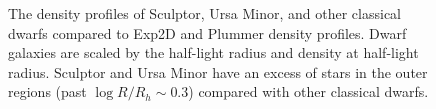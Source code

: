 \begin{figure}
\centering
{}
\caption[Classical dwarf density profiles]{The density profiles of
Sculptor, Ursa Minor, and other classical dwarfs compared to Exp2D and
Plummer density profiles. Dwarf galaxies are scaled by the half-light
radius and density at half-light radius. Sculptor and Ursa Minor have an
excess of stars in the outer regions (past \(\log R/R_h \sim 0.3\))
compared with other classical
dwarfs.}\label{fig:classical_dwarfs_densities}
\end{figure}
